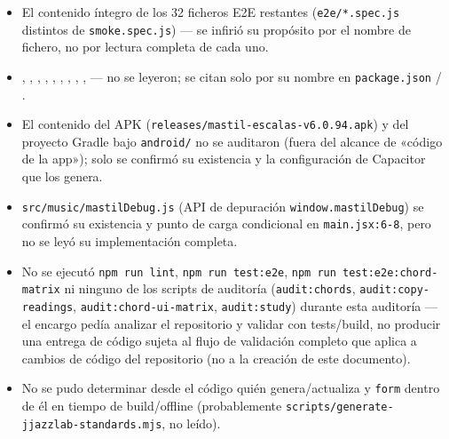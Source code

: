 \documentclass[a4paper,11pt,oneside]{report}
\begin{document}
\begin{itemize}[itemsep=0.5pt,topsep=2pt,parsep=0pt]
\item El contenido íntegro de los 32 ficheros E2E restantes (\lstinline!e2e/*.spec.js! distintos de \lstinline!smoke.spec.js!) --- se infirió su propósito por el nombre de fichero, no por lectura completa de cada uno.
\item \texttt{}, \texttt{}, \texttt{}, \texttt{}, \texttt{}, \texttt{}, \texttt{}, \texttt{}, \texttt{}, \texttt{} --- no se leyeron; se citan solo por su nombre en \lstinline!package.json! / \texttt{}.
\item El contenido del APK (\lstinline!releases/mastil-escalas-v6.0.94.apk!) y del proyecto Gradle bajo \lstinline!android/! no se auditaron (fuera del alcance de «código de la app»); solo se confirmó su existencia y la configuración de Capacitor que los genera.
\item \lstinline!src/music/mastilDebug.js! (API de depuración \lstinline!window.mastilDebug!) se confirmó su existencia y punto de carga condicional en \lstinline!main.jsx:6-8!, pero no se leyó su implementación completa.
\item No se ejecutó \lstinline!npm run lint!, \lstinline!npm run test:e2e!, \lstinline!npm run test:e2e:chord-matrix! ni ninguno de los scripts de auditoría (\lstinline!audit:chords!, \lstinline!audit:copy-readings!, \lstinline!audit:chord-ui-matrix!, \lstinline!audit:study!) durante esta auditoría --- el encargo pedía analizar el repositorio y validar con tests/build, no producir una entrega de código sujeta al flujo de validación completo que aplica a cambios de código del repositorio (no a la creación de este documento).
\item No se pudo determinar desde el código quién genera/actualiza \texttt{} y \lstinline!form! dentro de él en tiempo de build/offline (probablemente \lstinline!scripts/generate-jjazzlab-standards.mjs!, no leído).
\end{itemize}
\end{document}
